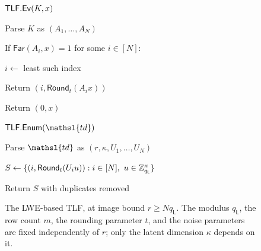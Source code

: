\begin{figure}[t]
{
\begin{oracle}{$\mathsf{TLF}.\mathsf{Ev}(K,x)$}
\item Parse $K$ as $(A_1,\ldots,A_N)$
\item If $\mathsf{Far}(A_i,x)=1$ for some $i\in[N]$:
\item \quad $i\gets$ least such index
\item \quad Return $(i,\mathsf{Round}_t(A_ix))$
\item Return $(0,x)$
\end{oracle}
\ExptSepSpace
\begin{oracle}{$\TLFEnum(\mathsl{td})$}
\item Parse $\mathsl{td}$ as $(r,\kappa,U_1,\ldots,U_N)$
\item $S\gets\{(i,\mathsf{Round}_t(U_iu)):
        i\in[N],\ u\in\mathbb Z_{q_{\mathsf L}}^{\kappa}\}$
\item Return $S$ with duplicates removed
\end{oracle}
}
\vspace{-12pt}
\caption{The LWE-based TLF, at image bound $r\ge Nq_{\mathsf L}$. The modulus
$q_{\mathsf L}$, the row count $m$, the rounding parameter $t$, and the noise
parameters are fixed independently of $r$; only the latent dimension $\kappa$
depends on it.}\label{fig-tlf-lwe}
\vspace{-3pt}\hrulefill
\vspace{-1ex}
\end{figure}

